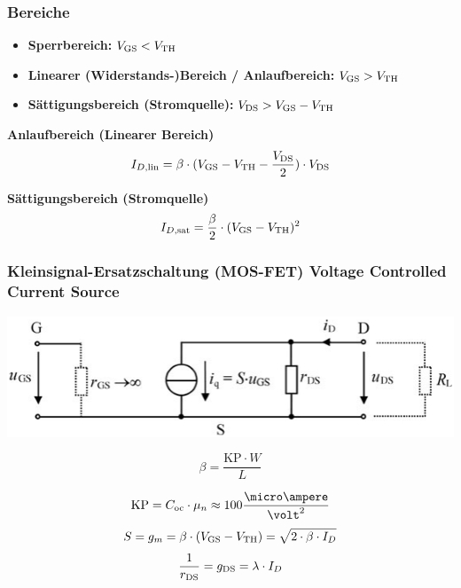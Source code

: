 \subsubsection{Bereiche}

\begin{itemize}
    \item \textbf{Sperrbereich:} $V_{\rm GS} < V_{\rm TH}$ 
    \item \textbf{Linearer (Widerstands-)Bereich / Anlaufbereich:} $V_{\rm GS} > V_{\rm TH}$
    \item \textbf{Sättigungsbereich (Stromquelle):} $V_{\rm DS} > V_{\rm GS} - V_{\rm TH}$
\end{itemize}

\vspace{0.2cm}

\begin{minipage}[t]{0.48\columnwidth}
    \textbf{Anlaufbereich (Linearer Bereich)}
    $$ I_{D,\rm lin} = \beta \cdot ( V_{\rm GS} - V_{\rm TH} - \frac{V_{\rm DS}}{2} ) \cdot V_{\rm DS} $$
\end{minipage}
\hfill
\begin{minipage}[t]{0.48\columnwidth}
    \textbf{Sättigungsbereich (Stromquelle)}
    $$  I_{D,\rm sat} = \frac{\beta}{2} \cdot ( V_{\rm GS} - V_{\rm TH} )^2 $$
\end{minipage}


\subsubsection{Kleinsignal-Ersatzschaltung (MOS-FET) Voltage Controlled Current Source}


\begin{minipage}[t]{0.64\columnwidth}
    \includegraphics[align=t, width=\columnwidth]{images/mos_fet_kleinsignalersatzschaltung.png}
\end{minipage}
\hfill
\begin{minipage}[t]{0.24\columnwidth}
    $$ \beta = \frac{\mathrm{KP} \cdot W}{L} $$
\end{minipage}
    $$ \mathrm{KP} = C_{\rm oc} \cdot \mu_n \approx 100 \frac{\micro \ampere}{\volt^2} $$  %
$$ S = g_m = \beta \cdot (V_{\rm GS} - V_{\rm TH}) = \sqrt{2 \cdot \beta \cdot I_D}$$ %
$$ \frac{1}{r_{\rm DS}} = g_{\rm DS} = \lambda \cdot I_D $$



